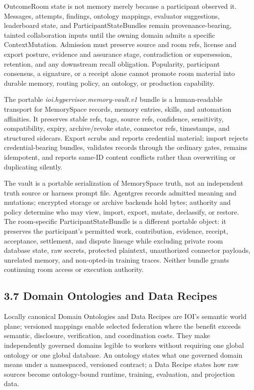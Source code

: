 \documentclass[
  11pt,
]{article}
\begin{document}
OutcomeRoom state is not memory merely because a participant observed it.
Messages, attempts, findings, ontology mappings, evaluator suggestions,
leaderboard state, and ParticipantStateBundles remain provenance-bearing,
tainted collaboration inputs until the owning domain admits a specific
ContextMutation. Admission must preserve source and room refs, license and
export posture, evidence and assurance stage, contradiction or supersession,
retention, and any downstream recall obligation. Popularity, participant
consensus, a signature, or a receipt alone cannot promote room material into
durable memory, routing policy, an ontology, or production capability.

The portable \emph{ioi.hypervisor.memory-vault.v1} bundle is a
human-readable transport for MemorySpace records, memory entries, skills, and
automation affinities. It preserves stable refs, tags, source refs,
confidence, sensitivity, compatibility, expiry, archive/revoke state,
connector refs, timestamps, and structured sidecars. Export scrubs and
reports credential material; import rejects credential-bearing bundles,
validates records through the ordinary gates, remains idempotent, and reports
same-ID content conflicts rather than overwriting or duplicating silently.

The vault is a portable serialization of MemorySpace truth, not an independent
truth source or harness prompt file. Agentgres records admitted meaning and
mutations; encrypted storage or archive backends hold bytes; authority and
policy determine who may view, import, export, mutate, declassify, or restore.
The room-specific ParticipantStateBundle is a different portable object: it
preserves the participant's permitted work, contribution, evidence, receipt,
acceptance, settlement, and dispute lineage while excluding private room
database state, raw secrets, protected plaintext, unauthorized connector
payloads, unrelated memory, and non-opted-in training traces. Neither bundle
grants continuing room access or execution authority.

\hypertarget{domain-ontologies-and-data-recipes}{%
\subsection{3.7 Domain Ontologies and Data
Recipes}\label{domain-ontologies-and-data-recipes}}

Locally canonical Domain Ontologies and Data Recipes are IOI's semantic world
plane; versioned mappings enable selected federation where the benefit exceeds
semantic, disclosure, verification, and coordination costs.
They make independently governed domains legible to workers without requiring
one global ontology or one global database. An ontology states what one
governed domain means under a namespaced, versioned contract; a Data Recipe
states how raw sources become ontology-bound runtime, training, evaluation,
and projection data.
\end{document}
